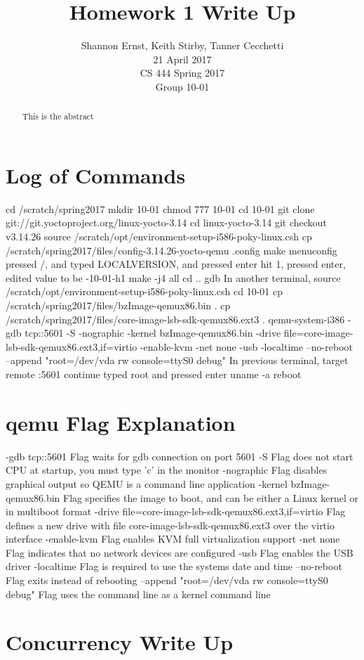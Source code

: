 \documentclass[letterpaper,10pt,serif,draftclsnofoot,onecolumn,compsoc,titlepage]{article}%
\title{Homework 1 Write Up}
\author{Shannon Ernst, Keith Stirby, Tanner Cecchetti \\ 21 April 2017 \\ CS 444 Spring 2017 \\ Group 10-01}
\begin{document}
\maketitle
\begin{abstract}
This is the abstract
\end{abstract}
\newpage
\section{Log of Commands}
cd /scratch/spring2017
mkdir 10-01
chmod 777 10-01
cd 10-01
git clone git://git.yoctoproject.org/linux-yocto-3.14
cd linux-yocto-3.14
git checkout v3.14.26
source /scratch/opt/environment-setup-i586-poky-linux.csh
cp /scratch/spring2017/files/config-3.14.26-yocto-qemu .config
make menuconfig
pressed /, and typed LOCALVERSION, and pressed enter
hit 1, pressed enter, edited value to be -10-01-h1
make -j4 all
cd ..
gdb
In another terminal, source /scratch/opt/environment-setup-i586-poky-linux.csh
cd 10-01
cp /scratch/spring2017/files/bzImage-qemux86.bin .
cp /scratch/spring2017/files/core-image-lsb-sdk-qemux86.ext3 .
qemu-system-i386 -gdb tcp::5601 -S -nographic -kernel bzImage-qemux86.bin -drive file=core-image-lsb-sdk-qemux86.ext3,if=virtio -enable-kvm -net none -usb -localtime --no-reboot --append "root=/dev/vda rw console=ttyS0 debug"
In previous terminal, target remote :5601
continue
typed root and pressed enter
uname -a
reboot
\section{qemu Flag Explanation}
-gdb tcp::5601 Flag waits for gdb connection on port 5601
-S Flag does not start CPU at startup, you must type 'c' in the monitor
-nographic Flag disables graphical output so QEMU is a command line application
-kernel bzImage-qemux86.bin Flag specifies the image to boot, and can be either a Linux kernel or in multiboot format
-drive file=core-image-lsb-sdk-qemux86.ext3,if=virtio Flag defines a new drive with file core-image-lsb-sdk-qemux86.ext3 over the virtio interface
-enable-kvm Flag enables KVM full virtualization support
-net none Flag indicates that no network devices are configured
-usb Flag enables the USB driver
-localtime Flag is required to use the systems date and time
--no-reboot Flag exits instead of rebooting
--append "root=/dev/vda rw console=ttyS0 debug" Flag uses the command line as a kernel command line
\section{Concurrency Write Up}
\end{document}
